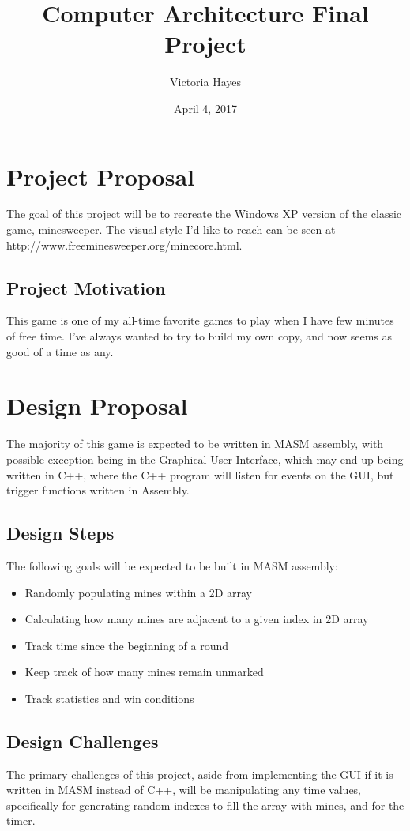 \documentclass{article}
\title{Computer Architecture Final Project}
\date{April 4, 2017}
\author{Victoria Hayes}
\begin{document}
	\maketitle
    \section{Project Proposal}
    The goal of this project will be to recreate the Windows XP version of the classic game, minesweeper. The visual style I'd like to reach can be seen at http://www.freeminesweeper.org/minecore.html. 
    \subsection{Project Motivation}
    This game is one of my all-time favorite games to play when I have few minutes of free time. I've always wanted to try to build my own copy, and now seems as good of a time as any.
    \section{Design Proposal}
    The majority of this game is expected to be written in MASM assembly, with possible exception being in the Graphical User Interface, which may end up being written in C++, where the C++ program will listen for events on the GUI, but trigger functions written in Assembly.
    \subsection{Design Steps}
    The following goals will be expected to be built in MASM assembly:
    \begin{itemize}
    \item Randomly populating mines within a 2D array
    \item Calculating how many mines are adjacent to a given index in 2D array
    \item Track time since the beginning of a round
    \item Keep track of how many mines remain unmarked
    \item Track statistics and win conditions
    \end{itemize}
    \subsection{Design Challenges}
    The primary challenges of this project, aside from implementing the GUI if it is written in MASM instead of C++, will be manipulating any time values, specifically for generating random indexes to fill the array with mines, and for the timer.
    
\end{document}
